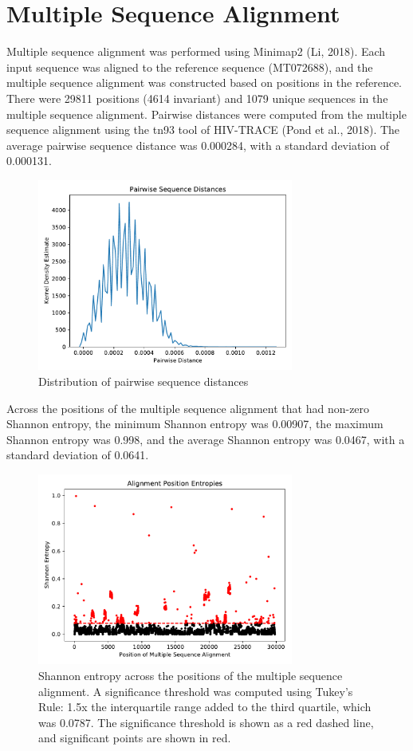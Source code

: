 \documentclass{article}
\begin{document}
\section{Multiple Sequence Alignment}
Multiple sequence alignment was performed using Minimap2 (Li, 2018). Each input sequence was aligned to the reference sequence (MT072688), and the multiple sequence alignment was constructed based on positions in the reference. There were 29811 positions (4614 invariant) and 1079 unique sequences in the multiple sequence alignment. Pairwise distances were computed from the multiple sequence alignment using the tn93 tool of HIV-TRACE (Pond et al., 2018). The average pairwise sequence distance was 0.000284, with a standard deviation of 0.000131.

\begin{figure}[h]
\centering
\includegraphics[width=0.75\textwidth,keepaspectratio]{./figs/pairwise_distances_sequences.pdf}
\caption{Distribution of pairwise sequence distances}
\end{figure}

 Across the positions of the multiple sequence alignment that had non-zero Shannon entropy, the minimum Shannon entropy was 0.00907, the maximum Shannon entropy was 0.998, and the average Shannon entropy was 0.0467, with a standard deviation of 0.0641.

\begin{figure}[h]
\centering
\includegraphics[width=0.75\textwidth,keepaspectratio]{./figs/alignment_entropies.pdf}
\caption{Shannon entropy across the positions of the multiple sequence alignment. A significance threshold was computed using Tukey's Rule: 1.5x the interquartile range added to the third quartile, which was 0.0787. The significance threshold is shown as a red dashed line, and significant points are shown in red.}
\end{figure}
\end{document}
